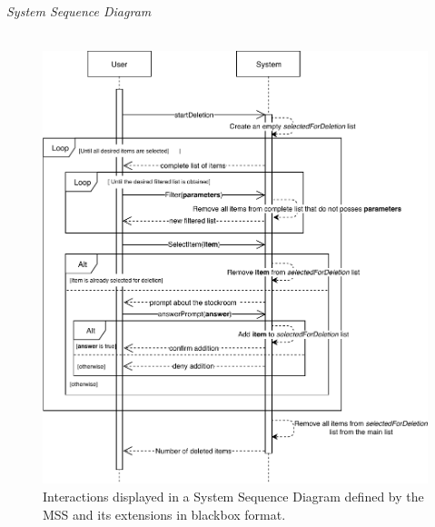 \textsl{System Sequence Diagram}\\\\
\begin{figure}[H]
	\centering
	\includegraphics[scale=1]{uml/SD-bb-delete.pdf}
	\caption*{Interactions displayed in a System Sequence Diagram defined by the MSS and its extensions in blackbox format.}
\end{figure}
